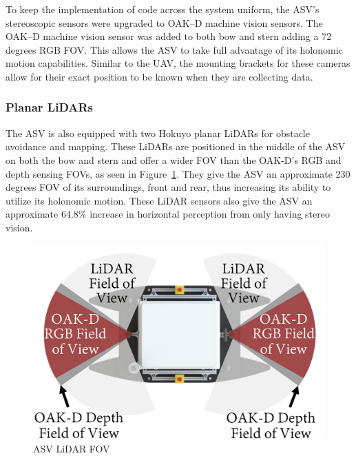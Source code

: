 \documentclass[letterpaper, 12 pt, conference]{ieeeconf}
\begin{document}
To keep the implementation of code across the system uniform, the ASV's stereoscopic sensors were upgraded to OAK--D machine vision sensors. The OAK--D machine vision sensor was added to both bow and stern adding a 72 degrees RGB FOV. This allows the ASV to take full advantage of its holonomic motion capabilities. Similar to the UAV, the mounting brackets for these cameras allow for their exact position to be known when they are collecting data.
\subsubsection{Planar LiDARs}
The ASV is also equipped with two Hokuyo planar LiDARs for obstacle avoidance and mapping. These LiDARs are positioned in the middle of the ASV on both the bow and stern and offer a wider FOV than the OAK-D's RGB and depth sensing FOVs, as seen in Figure~\ref{fig:ASVLiDAR}. They give the ASV an approximate 230 degrees FOV of its surroundings, front and rear, thus increasing its ability to utilize its holonomic motion. These LiDAR sensors also give the ASV an approximate 64.8\% increase in horizontal perception from only having stereo vision.
%
\begin{figure}[tb]
\centering
\includegraphics[width=\columnwidth]{TDR/Figures/ASV_fieldOfView_gray_v4_Adobe Devanagari.pdf}
\caption{ASV LiDAR FOV}
\label{fig:ASVLiDAR}
\end{figure}
%
\end{document}
